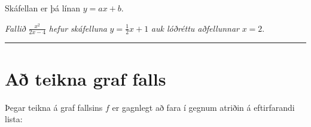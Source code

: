 \documentclass[a4paper,10pt,icelandic]{sphinxmanual}
\begin{document}
Skáfellan er þá línan \(y=ax+b\).


\emph{Fallið} \(\frac{x^2}{2x-4}\) \emph{hefur skáfelluna} \(y=\frac{1}{2}x+1\) \emph{auk lóðréttu aðfellunnar} \(x=2\).


\bigskip\hrule{}\bigskip

\newpage

\section{Að teikna graf falls}
\label{kafli05:a-teikna-graf-falls}
Þegar teikna á graf fallsins \(f\) er gagnlegt að fara í gegnum atriðin á eftirfarandi lista:
\end{document}
